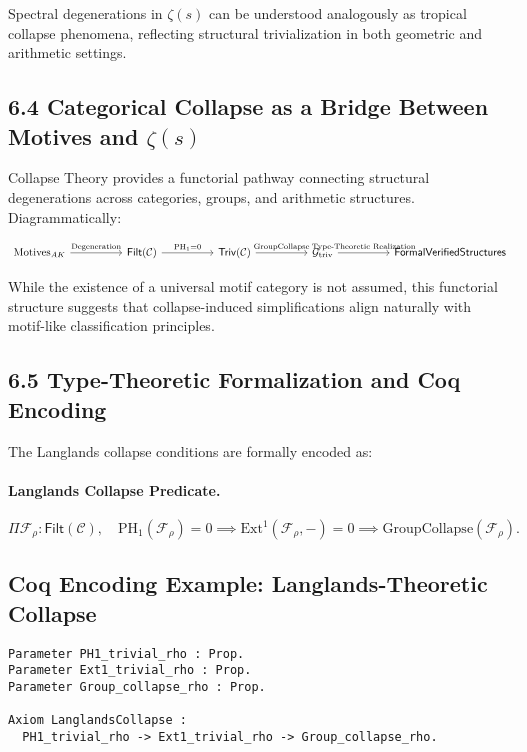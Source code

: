 \documentclass[11pt]{article}
\begin{document}
Spectral degenerations in $\zeta(s)$ can be understood analogously as tropical collapse phenomena, reflecting structural trivialization in both geometric and arithmetic settings.

\subsection*{6.4 Categorical Collapse as a Bridge Between Motives and $\zeta(s)$}

Collapse Theory provides a functorial pathway connecting structural degenerations across categories, groups, and arithmetic structures. Diagrammatically:

\[
\begin{tikzcd}[column sep=huge]
\mathrm{Motives}_{AK} \arrow[r, "\text{Degeneration}"]
& \mathsf{Filt}(\mathcal{C}) \arrow[r, "\mathrm{PH}_1 = 0"]
& \mathsf{Triv}(\mathcal{C}) \arrow[r, "\mathrm{GroupCollapse}"]
& \mathcal{G}_{\mathrm{triv}} \arrow[r, "\text{Type-Theoretic Realization}"]
& \mathsf{Formal Verified Structures}
\end{tikzcd}
\]

While the existence of a universal motif category is not assumed, this functorial structure suggests that collapse-induced simplifications align naturally with motif-like classification principles.

\subsection*{6.5 Type-Theoretic Formalization and Coq Encoding}

The Langlands collapse conditions are formally encoded as:

\paragraph{Langlands Collapse Predicate.}
\[
\Pi \mathcal{F}_\rho : \mathsf{Filt}(\mathcal{C}), \quad \mathrm{PH}_1(\mathcal{F}_\rho) = 0 \implies \mathrm{Ext}^1(\mathcal{F}_\rho, -) = 0 \implies \mathrm{GroupCollapse}(\mathcal{F}_\rho).
\]

\subsection*{Coq Encoding Example: Langlands-Theoretic Collapse}

\begin{lstlisting}[language=Coq, caption=Langlands-Theoretic Collapse Formalization, captionpos=b]
Parameter PH1_trivial_rho : Prop.
Parameter Ext1_trivial_rho : Prop.
Parameter Group_collapse_rho : Prop.

Axiom LanglandsCollapse :
  PH1_trivial_rho -> Ext1_trivial_rho -> Group_collapse_rho.
\end{lstlisting}
\end{document}

